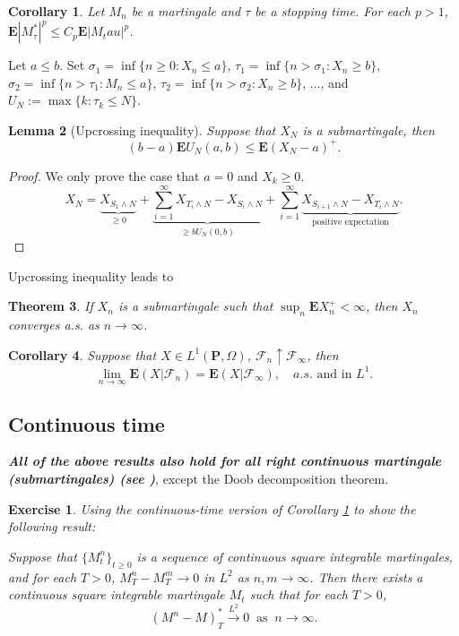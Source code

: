 \documentclass[twoside, 12pt]{book}
\numberwithin{equation}{chapter}
\newtheorem{theorem}{Theorem}[section]
\newtheorem{lemma}[theorem]{Lemma}
\newtheorem{corollary}[theorem]{Corollary}
\newtheorem{exercise}{Exercise}[section]
\def\cF{{\mathcal F}}
\def\bE{{\mathbf E}}
\def\bP{{\mathbf P}}
\def\geq{\geqslant}
\def\leq{\leqslant}
\begin{document}
	\begin{corollary}\label{cor:Doob-Lp}
		Let $M_n$ be a martingale and $\tau$ be a stopping time. For each $p>1$, $\bE |M_\tau^*|^p \leq C_p \bE |M_tau|^p$. 
	\end{corollary}
	
	 Let $a\leq b$. Set $\sigma_1=\inf\{n\geq 0: X_n\leq a\}$, $\tau_1= \inf\{n>\sigma_1: X_n\geq b\}$, $\sigma_2=\inf\{n>\tau_1: M_n\leq a\}$, $\tau_2= \inf\{n>\sigma_2: X_n\geq b\}$, $\dots$, and 
	$U_N:= \max\{k: \tau_k\leq N\}$. 
	\begin{lemma}[Upcrossing inequality]
		Suppose that $X_N$ is a submartingale, then 
		\[
		(b-a)\bE U_N(a,b) \leq \bE (X_{N}-a)^+. 
		\]
	\end{lemma}
	\begin{proof}
		We only prove the case that $a=0$ and $X_k\geq 0$. 
		\[
		X_N=\underbrace{X_{S_1\wedge N}}_{\geq 0}+\underbrace{\sum_{i=1}^\infty X_{T_i\wedge N}-X_{S_i\wedge N}}_{\geq bU_N(0,b)}+ \sum_{i=1}^\infty \underbrace{X_{S_{i+1}\wedge N}-X_{T_i\wedge N}}_{\mbox{positive expectation}}. 
		\] 
	\end{proof}
	Upcrossing inequality leads to 
	\begin{theorem}
		If $X_n$ is a submartingale such that $\sup_{n} \bE X_n^{+}<\infty$, then $X_n$ converges a.s. as $n\to \infty$. 
	\end{theorem}
	\begin{corollary}\label{Cor-convergence}
		Suppose that $X\in L^1(\bP, \Omega)$, $\cF_n\uparrow \cF_\infty$, then 
		\[
		\lim_{n\to\infty}\bE (X|\cF_n) = \bE (X|\cF_\infty),\quad a.s. \mbox{ and in } L^1. 
		\]
	\end{corollary} 
	
	\subsection{Continuous time}
	
	{\bf {\em All of the above results also hold for all right continuous martingale (submartingales) (see \cite{Huang})}}, except the Doob decomposition theorem. 
	
	\begin{exercise}\label{ex:mart-l2}
		Using the continuous-time version of Corollary \ref{cor:Doob-Lp} to show the following result: 
		
		Suppose that $\{M^n_t\}_{t\geq 0}$ is a sequence of continuous square integrable martingales, and for each $T>0$, $M_T^n-M^m_T\to 0$ in $L^2$ as $n,m\to \infty$. Then there exists a continuous square integrable martingale $M_t$ such that for each $T>0$,  
		\[
		    (M^n-M)^*_T \overset{L^2}{\rightarrow} 0 ~\mbox{ as }~ n\to \infty. 
		\]
	\end{exercise}
	
\end{document}
